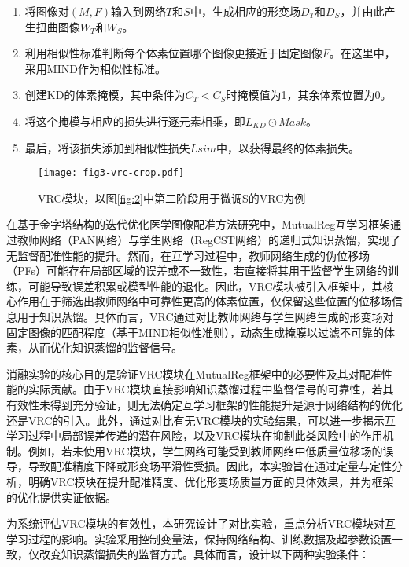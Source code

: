 \begin{enumerate}
    \item 将图像对$(M,F)$输入到网络$T$和$S$中，生成相应的形变场$D_T$和$D_S$，并由此产生扭曲图像$W_T$和$W_S$。
    \item 利用相似性标准判断每个体素位置哪个图像更接近于固定图像$F$。在这里中，采用MIND作为相似性标准。
    \item 创建KD的体素掩模，其中条件为$C_T<C_S$时掩模值为1，其余体素位置为0。
    \item 将这个掩模与相应的损失进行逐元素相乘，即$L_{KD} \odot Mask$。
    \item 最后，将该损失添加到相似性损失$L{sim}$中，以获得最终的体素损失。
\end{enumerate}

\begin{figure}[h]
    \centering
    \texttt{[image: fig3-vrc-crop.pdf]}
    \caption{VRC模块，以图\ref{fig:2}中第二阶段用于微调S的VRC为例}
    \label{fig:3}
\end{figure}



在基于金字塔结构的迭代优化医学图像配准方法研究中，MutualReg互学习框架通过教师网络（PAN网络）与学生网络（RegCST网络）的递归式知识蒸馏，实现了无监督配准性能的提升。然而，在互学习过程中，教师网络生成的伪位移场（PFs）可能存在局部区域的误差或不一致性，若直接将其用于监督学生网络的训练，可能导致误差积累或模型性能的退化。因此，VRC模块被引入框架中，其核心作用在于筛选出教师网络中可靠性更高的体素位置，仅保留这些位置的位移场信息用于知识蒸馏。具体而言，VRC通过对比教师网络与学生网络生成的形变场对固定图像的匹配程度（基于MIND相似性准则），动态生成掩膜以过滤不可靠的体素，从而优化知识蒸馏的监督信号。

消融实验的核心目的是验证VRC模块在MutualReg框架中的必要性及其对配准性能的实际贡献。由于VRC模块直接影响知识蒸馏过程中监督信号的可靠性，若其有效性未得到充分验证，则无法确定互学习框架的性能提升是源于网络结构的优化还是VRC的引入。此外，通过对比有无VRC模块的实验结果，可以进一步揭示互学习过程中局部误差传递的潜在风险，以及VRC模块在抑制此类风险中的作用机制。例如，若未使用VRC模块，学生网络可能受到教师网络中低质量位移场的误导，导致配准精度下降或形变场平滑性受损。因此，本实验旨在通过定量与定性分析，明确VRC模块在提升配准精度、优化形变场质量方面的具体效果，并为框架的优化提供实证依据。



为系统评估VRC模块的有效性，本研究设计了对比实验，重点分析VRC模块对互学习过程的影响。实验采用控制变量法，保持网络结构、训练数据及超参数设置一致，仅改变知识蒸馏损失的监督方式。具体而言，设计以下两种实验条件：

